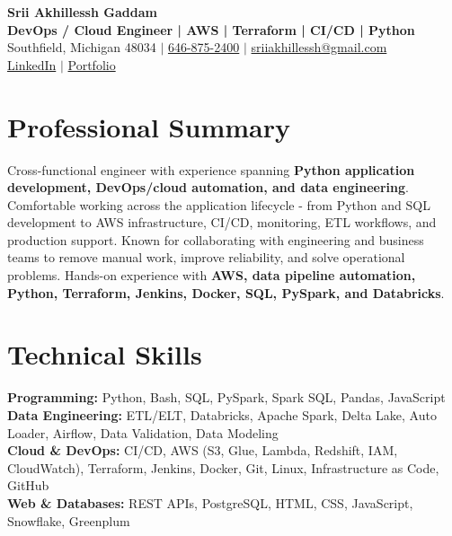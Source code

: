 \documentclass[letterpaper,10pt]{article}
\begin{document}
\fontsize{9.35pt}{10.45pt}\selectfont

\begin{center}
    {\LARGE \textbf{Srii Akhillessh Gaddam}} \\[-1pt]
    \textbf{DevOps / Cloud Engineer | AWS | Terraform | CI/CD | Python} \\[2pt]
    Southfield, Michigan 48034 $|$
    \href{tel:6468752400}{646-875-2400} $|$
    \href{mailto:sriiakhillessh@gmail.com}{sriiakhillessh@gmail.com} \\[1pt]
    \href{https://www.linkedin.com/in/srii-akhiilessh-gaddam-b48668191/}{LinkedIn} $|$
    \href{https://sriiakhillesshg.github.io/portfolio/}{Portfolio}
\end{center}
\vspace{-8pt}

\section{Professional Summary}
\small{Cross-functional engineer with experience spanning \textbf{Python application development, DevOps/cloud automation, and data engineering}. Comfortable working across the application lifecycle - from Python and SQL development to AWS infrastructure, CI/CD, monitoring, ETL workflows, and production support. Known for collaborating with engineering and business teams to remove manual work, improve reliability, and solve operational problems. Hands-on experience with \textbf{AWS, data pipeline automation, Python, Terraform, Jenkins, Docker, SQL, PySpark, and Databricks}.}

\section{Technical Skills}
\small{
\textbf{Programming:} Python, Bash, SQL, PySpark, Spark SQL, Pandas, JavaScript \\
\textbf{Data Engineering:} ETL/ELT, Databricks, Apache Spark, Delta Lake, Auto Loader, Airflow, Data Validation, Data Modeling \\
\textbf{Cloud \& DevOps:} CI/CD, AWS (S3, Glue, Lambda, Redshift, IAM, CloudWatch), Terraform, Jenkins, Docker, Git, Linux, Infrastructure as Code, GitHub \\
\textbf{Web \& Databases:} REST APIs, PostgreSQL, HTML, CSS, JavaScript, Snowflake, Greenplum
}
\end{document}
